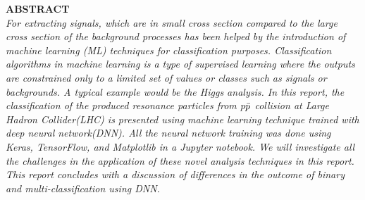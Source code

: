 \begin{center}
{\large {\bf  ABSTRACT }}\\
\textit{For extracting  signals, which are in small cross section compared to the large cross section of the background processes has been helped by the introduction of machine learning (ML) techniques for  classification purposes. Classification algorithms in machine learning is a type of supervised learning where the outputs are constrained only to a limited set of values or classes such as signals or backgrounds. A typical example would be the Higgs analysis. In this report, the classification of the produced resonance particles from p$\Bar{p}$ collision at Large Hadron Collider(LHC) is presented using machine learning technique trained with deep neural network(DNN). All the neural network training was done using Keras, TensorFlow, and Matplotlib in a Jupyter notebook. We will investigate all the challenges in the application of these novel analysis techniques in this report. This report concludes with a discussion of differences in the outcome of binary and multi-classification using DNN. 
}

\end{center}  


    

